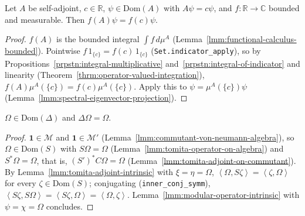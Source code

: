 \begin{lemma}
    \label{lmm:spectral-eigenvector-bounded-fc}
    \leanok
    Let $A$ be self-adjoint, $c \in \mathbb{R}$, $\psi \in \text{Dom}(A)$ with $A\psi = c\psi$, and $f : \mathbb{R} \to \mathbb{C}$ bounded and measurable. Then $f(A)\psi = f(c)\psi$.
\end{lemma}
\begin{proof}
    \leanok
    $f(A)$ is the bounded integral $\int f \, d\mu^A$ (Lemma~\ref{lmm:functional-calculus-bounded}). Pointwise $f\,1_{\{c\}} = f(c)\,1_{\{c\}}$ (\texttt{Set.indicator\_apply}), so by Propositions~\ref{prpstn:integral-multiplicative} and~\ref{prpstn:integral-of-indicator} and linearity (Theorem~\ref{thrm:operator-valued-integration}), $f(A)\mu^A(\{c\}) = f(c)\mu^A(\{c\})$. Apply this to $\psi = \mu^A(\{c\})\psi$ (Lemma~\ref{lmm:spectral-eigenvector-projection}).
\end{proof}

\begin{lemma}[$\Delta\Omega = \Omega$]
    \label{lmm:modular-operator-fixes-omega}
    \leanok
    $\Omega \in \text{Dom}(\Delta)$ and $\Delta\Omega = \Omega$.
\end{lemma}
\begin{proof}
    \leanok
    $\mathbf{1} \in \mathcal{M}$ and $\mathbf{1} \in \mathcal{M}'$ (Lemma~\ref{lmm:commutant-von-neumann-algebra}), so $\Omega \in \text{Dom}(S)$ with $S\Omega = \Omega$ (Lemma~\ref{lmm:tomita-operator-on-algebra}) and $S^*\Omega = \Omega$, that is, $(S')^*C\Omega = \Omega$ (Lemma~\ref{lmm:tomita-adjoint-on-commutant}). By Lemma~\ref{lmm:tomita-adjoint-intrinsic} with $\xi = \eta = \Omega$, $\left< \Omega, S\zeta \right> = \left< \zeta, \Omega \right>$ for every $\zeta \in \text{Dom}(S)$; conjugating (\texttt{inner\_conj\_symm}), $\left< S\zeta, S\Omega \right> = \left< S\zeta, \Omega \right> = \left< \Omega, \zeta \right>$. Lemma~\ref{lmm:modular-operator-intrinsic} with $\psi = \chi = \Omega$ concludes.
\end{proof}

